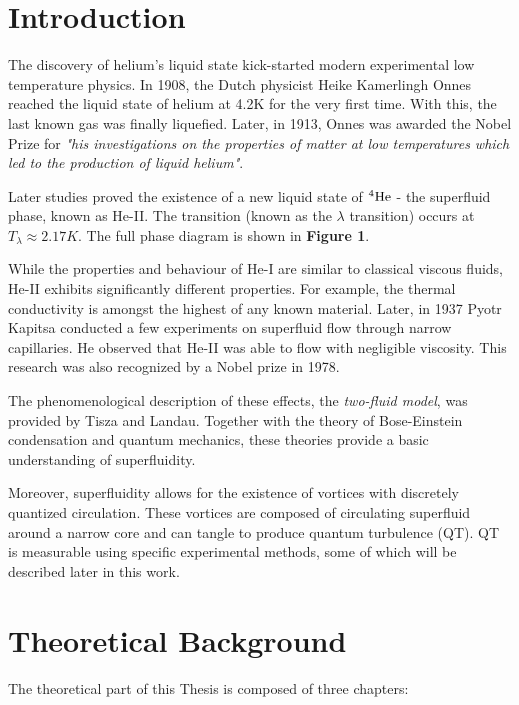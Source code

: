 \chapter*{Introduction}

The discovery of helium's liquid state kick-started modern experimental  low temperature physics. In 1908, the Dutch physicist Heike Kamerlingh Onnes reached the liquid state of helium at 4.2K for the very first time. With this, the last known gas was finally liquefied. Later, in 1913, Onnes was awarded the Nobel Prize for \textit{"his investigations on the properties of matter at low temperatures which led to the production of liquid helium"}.

Later studies proved the existence of a new liquid state of $ {}^4\mathrm{He} $ - the superfluid phase, known as He-II. The transition (known as the $ \lambda$ transition) occurs at $ T_{\lambda} \approx 2.17\unit{K} $. The full phase diagram is shown in {\sffamily\textbf{Figure 1}}.

While the properties and behaviour of He-I are similar to classical viscous fluids, He-II exhibits significantly different properties. For example, the thermal conductivity is amongst the highest of any known material. Later, in 1937 Pyotr Kapitsa\cite{kapitsa} conducted a few experiments on superfluid flow through narrow capillaries. He observed that He-II was able to flow with negligible viscosity. This research was also recognized by a Nobel prize in 1978.

The phenomenological description of these effects, the \textit{two-fluid model}, was provided by Tisza and Landau. Together with the theory of Bose-Einstein condensation and quantum mechanics, these theories provide a basic understanding of superfluidity.

Moreover, superfluidity allows for the existence of vortices with discretely quantized circulation. These vortices are composed of circulating superfluid around a narrow core and can tangle to produce quantum turbulence (QT). QT is measurable using specific experimental methods, some of which will be described later in this work.

\newpage
\chapter{Theoretical Background}

The theoretical part of this Thesis is composed of three chapters:

